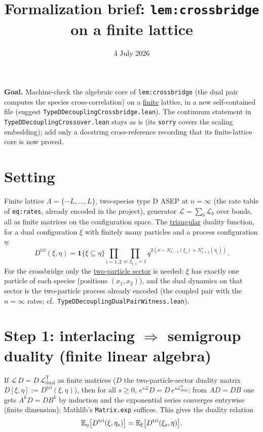 \documentclass[11pt]{article}
\title{Formalization brief: \texttt{lem:crossbridge} on a finite lattice}
\date{4 July 2026}
\theoremstyle{plain}
\theoremstyle{remark}
\newcommand{\bone}{\mathbf 1}
\begin{document}
\maketitle

\noindent\textbf{Goal.} Machine-check the algebraic core of \texttt{lem:crossbridge}
(the dual pair computes the species cross-correlation) on a \underline{finite} lattice,
in a new self-contained file (suggest \texttt{TypeDDecouplingCrossbridge.lean}). The
continuum statement in \texttt{TypeDDecouplingCrossover.lean} stays as is (its
\texttt{sorry} covers the scaling embedding); add only a docstring cross-reference
recording that its finite-lattice core is now proved.

\section*{Setting}

Finite lattice $\Lambda=\{-L,\dots,L\}$, two-species type D ASEP at $n=\infty$
(the rate table of \texttt{eq:rates}, already encoded in the project), generator
$\mathcal L=\sum_b\mathcal L_b$ over bonds, all as finite matrices on the
configuration space. The \underline{triangular} duality function, for a dual configuration
$\xi$ with finitely many particles and a process configuration $\eta$:
\[
  D^{\mathrm{tri}}(\xi,\eta)=\bone\{\xi\subseteq\eta\}
  \prod_{i=1,2}\prod_{x:\,\xi_{i,x}=1}
  q^{2\left(x-N^-_{x-1}(\xi_i)+N^+_{x+1}(\eta_i)\right)} .
\]
For the crossbridge only the \underline{two-particle sector} is needed: $\xi$ has exactly
one particle of each species (positions $(x_1,x_2)$), and the dual dynamics on that
sector is the two-particle process already encoded (the coupled pair with the
$n=\infty$ rates; cf.\ \texttt{TypeDDecouplingDualPairWitness.lean}).

\section*{Step 1: interlacing $\Rightarrow$ semigroup duality (finite linear algebra)}

If $\mathcal L\,D=D\,\mathcal L_{\mathrm{dual}}^{\mathsf T}$ as finite matrices
($D$ the two-particle-sector duality matrix $D[\xi,\eta]:=D^{\mathrm{tri}}(\xi,\eta)$),
then for all $s\ge0$, $e^{s\mathcal L}D=D\,e^{s\mathcal L_{\mathrm{dual}}^{\mathsf T}}$:
from $AD=DB$ one gets $A^kD=DB^k$ by induction and the exponential series converges
entrywise (finite dimension); Mathlib's \texttt{Matrix.exp} suffices. This gives the
duality relation
\begin{equation}\label{eq:dualrel}
  \mathbb{E}_\eta\big[D^{\mathrm{tri}}(\xi,\eta_s)\big]
  =\mathbb{E}_\xi\big[D^{\mathrm{tri}}(\xi_s,\eta)\big].
\end{equation}
\end{document}

